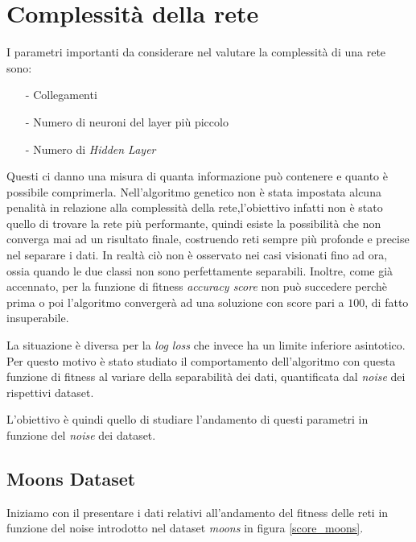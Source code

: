 \documentclass[12pt,a4paper]{report}
\begin{document}
\newpage

\section{Complessità della rete} 

I parametri importanti da considerare nel valutare la complessità di una rete sono:

\begin{enumerate}
 \item[-] Collegamenti
 \item[-] Numero di neuroni del layer più piccolo
 \item[-] Numero di \textit{Hidden Layer}
\end{enumerate}

Questi ci danno una misura di quanta informazione può contenere e quanto è possibile comprimerla.
Nell'algoritmo genetico non è stata impostata alcuna penalità in relazione alla complessità della rete,l'obiettivo infatti non è stato quello di trovare la rete più performante, quindi esiste la possibilità che non converga mai ad un risultato finale, costruendo reti sempre più profonde e precise nel separare i dati.
In realtà ciò non è osservato nei casi visionati fino ad ora, ossia quando le due classi non sono perfettamente separabili. 
Inoltre, come già accennato, per la funzione di fitness \textit{accuracy score} non può succedere perchè prima o poi l'algoritmo convergerà ad una soluzione con score pari a $100$\textdiscount, di fatto insuperabile.

La situazione è diversa per la \textit{log loss} che invece ha un limite inferiore asintotico. 
Per questo motivo è stato studiato il comportamento dell'algoritmo con questa funzione di fitness al variare della separabilità dei dati, quantificata dal \textit{noise} dei rispettivi dataset. 

L'obiettivo è quindi quello di studiare l'andamento di questi parametri in funzione del \textit{noise } dei dataset.

\subsection{Moons Dataset}

Iniziamo con il presentare i dati relativi all'andamento del fitness delle reti in funzione del noise introdotto nel dataset \textit{moons} in figura \ref{score_moons}.
\end{document}
